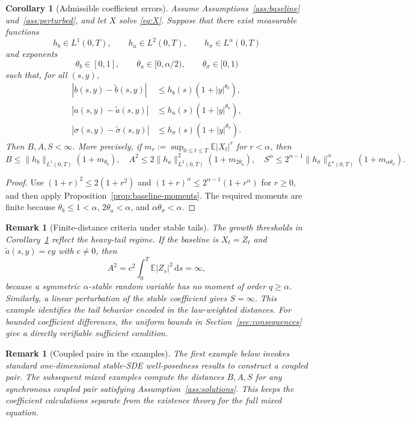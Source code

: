 \documentclass[10pt,a4paper]{amsart}
\newtheorem{corollary}[theorem]{Corollary}
\newtheorem{remark}[theorem]{Remark}
\newcommand{\E}{\mathbb{E}}
\newcommand{\1}{\mathbf{1}}
\newcommand{\dd}{\,\mathrm{d}}
\newcommand{\wt}{\tilde}
\begin{document}
\begin{corollary}[Admissible coefficient errors]\label{cor:admissible-distances}
Assume Assumptions~\ref{ass:baseline} and~\ref{ass:perturbed}, and let $X$ solve \eqref{eq:X}. Suppose that there exist measurable functions
\[
  h_b\in L^1(0,T),\qquad h_a\in L^2(0,T),\qquad h_\sigma\in L^\alpha(0,T)
\]
and exponents
\[
  \theta_b\in[0,1],\qquad \theta_a\in[0,\alpha/2),\qquad \theta_\sigma\in[0,1)
\]
such that, for all $(s,y)$,
\begin{align*}
|b(s,y)-\wt b(s,y)|&\le h_b(s)(1+|y|^{\theta_b}),\\
|a(s,y)-\wt a(s,y)|&\le h_a(s)(1+|y|^{\theta_a}),\\
|\sigma(s,y)-\wt\sigma(s,y)|&\le h_\sigma(s)(1+|y|^{\theta_\sigma}).
\end{align*}
Then $B,A,S<\infty$. More precisely, if $m_r:=\sup_{0\le t\le T}\E|X_t|^r$ for $r<\alpha$, then
\[
B\le \|h_b\|_{L^1(0,T)}(1+m_{\theta_b}),\quad
A^2\le 2\|h_a\|_{L^2(0,T)}^2(1+m_{2\theta_a}),\quad
S^\alpha\le 2^{\alpha-1}\|h_\sigma\|_{L^\alpha(0,T)}^\alpha(1+m_{\alpha\theta_\sigma}).
\]
\end{corollary}

\begin{proof}
Use $(1+r)^2\le2(1+r^2)$ and $(1+r)^\alpha\le2^{\alpha-1}(1+r^\alpha)$ for $r\ge0$, and then apply Proposition~\ref{prop:baseline-moments}. The required moments are finite because $\theta_b\le1<\alpha$, $2\theta_a<\alpha$, and $\alpha\theta_\sigma<\alpha$.
\end{proof}

\begin{remark}[Finite-distance criteria under stable tails]
The growth thresholds in Corollary~\ref{cor:admissible-distances} reflect the heavy-tail regime. If the baseline is $X_t=Z_t$ and $\wt a(s,y)=c y$ with $c\ne0$, then
\[
  A^2=c^2\int_0^T\E|Z_s|^2\dd s=\infty,
\]
because a symmetric $\alpha$-stable random variable has no moment of order $q\ge\alpha$. Similarly, a linear perturbation of the stable coefficient gives $S=\infty$. This example identifies the tail behavior encoded in the law-weighted distances. For bounded coefficient differences, the uniform bounds in Section~\ref{sec:consequences} give a directly verifiable sufficient condition.
\end{remark}


\begin{remark}[Coupled pairs in the examples]
The first example below invokes standard one-dimensional stable-SDE well-posedness results to construct a coupled pair. The subsequent mixed examples compute the distances $B,A,S$ for any synchronous coupled pair satisfying Assumption~\ref{ass:solutions}. This keeps the coefficient calculations separate from the existence theory for the full mixed equation.
\end{remark}
\end{document}
